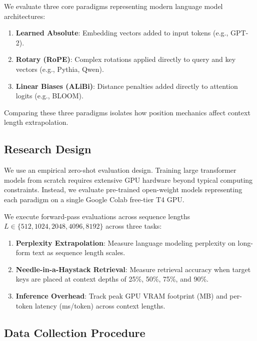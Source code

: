 \documentclass[conference]{IEEEtran}
\begin{document}
We evaluate three core paradigms representing modern language model architectures:
\begin{enumerate}
\item \textbf{Learned Absolute}: Embedding vectors added to input tokens (e.g., GPT-2).
\item \textbf{Rotary (RoPE)}: Complex rotations applied directly to query and key vectors \cite{su2024roformer} (e.g., Pythia, Qwen).
\item \textbf{Linear Biases (ALiBi)}: Distance penalties added directly to attention logits \cite{press2022} (e.g., BLOOM).
\end{enumerate}
Comparing these three paradigms isolates how position mechanics affect context length extrapolation.

\subsection{Research Design}

We use an empirical zero-shot evaluation design. Training large transformer models from scratch requires extensive GPU hardware beyond typical computing constraints. Instead, we evaluate pre-trained open-weight models representing each paradigm on a single Google Colab free-tier T4 GPU.

We execute forward-pass evaluations across sequence lengths $L \in \{512, 1024, 2048, 4096, 8192\}$ across three tasks:
\begin{enumerate}
\item \textbf{Perplexity Extrapolation}: Measure language modeling perplexity on long-form text as sequence length scales.
\item \textbf{Needle-in-a-Haystack Retrieval}: Measure retrieval accuracy when target keys are placed at context depths of 25\%, 50\%, 75\%, and 90\%.
\item \textbf{Inference Overhead}: Track peak GPU VRAM footprint (MB) and per-token latency (ms/token) across context lengths.
\end{enumerate}

\subsection{Data Collection Procedure}
\end{document}
